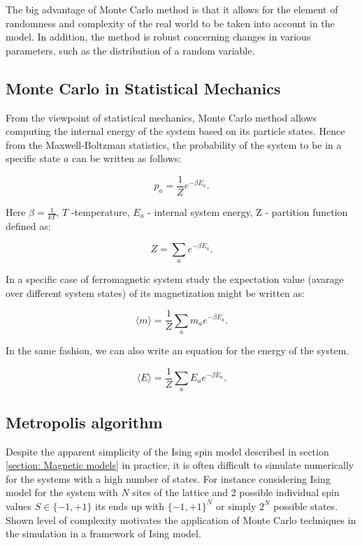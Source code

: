 The big advantage of Monte Carlo method is that it allows for the element of randomness and complexity of the real world to be taken into account in the model. In addition, the method is robust concerning changes in various parameters, such as the distribution of a random variable. 

\subsection{Monte Carlo in Statistical Mechanics}

From the viewpoint of statistical mechanics, Monte Carlo method allows computing the internal energy of the system based on its particle states. Hence from the Maxwell-Boltzman statistics, the probability of the system to be in a specific state $a$ can be written as follows:

\begin{equation}
p_a = \frac{1}{Z}e^{-\beta E_a}.
\end{equation}


Here $\beta = \frac{1}{kT}$, $T$  -temperature, $E_a$ - internal system energy,  Z - partition function defined as:

\begin{equation}
Z = \sum \limits_{a} e^{-\beta E_a}.
\end{equation}

In a specific case of ferromagnetic system study the expectation value (avarage over different system states) of its magnetization might be written as:

\begin{equation}
\langle m \rangle = \frac{1}{Z}\sum \limits_{a}m_a e^{-\beta E_a}.
\end{equation}

In the same fashion, we can also write an equation for the energy of the system.

\begin{equation}
\langle E \rangle = \frac{1}{Z}\sum \limits_{a}E_a e^{-\beta E_a}.
\end{equation}

\subsection{Metropolis algorithm}
Despite the apparent simplicity of the Ising spin model described in section  \ref{section: Magnetic models} in practice, it is often difficult to simulate numerically for the systems with a high number of states.  For instance considering Ising model for the system with $N$ sites of the lattice and 2 possible individual spin values $S\in \{-1, +1 \}$ its ends up with $\{-1, +1 \}^N$ or simply $2^N$ possible states. Shown level of complexity motivates the application of Monte Carlo techniques in the simulation in a framework of Ising model.

